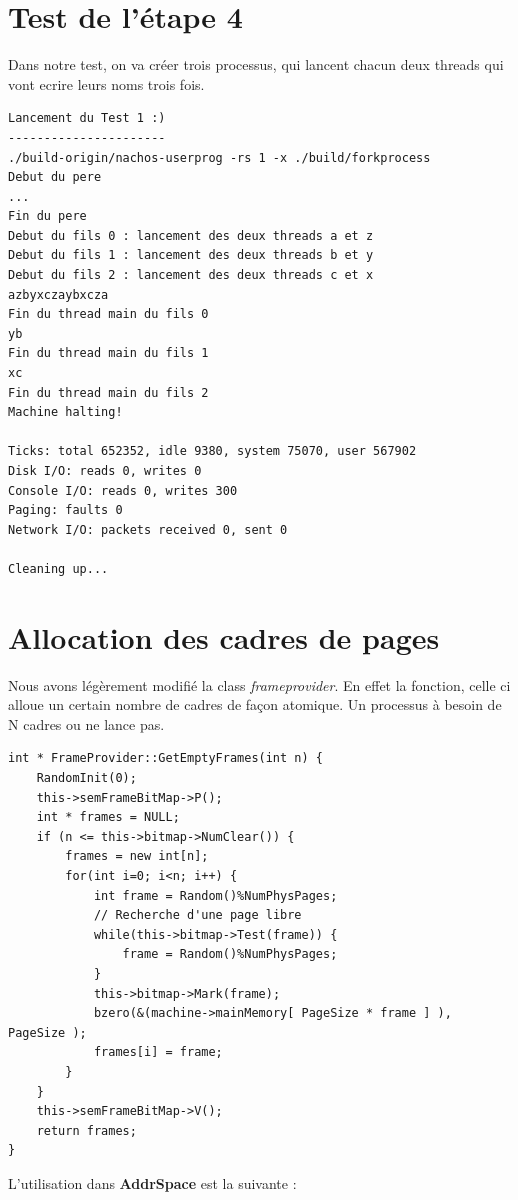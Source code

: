 \documentclass[a4paper,10pt]{article}
\begin{document}
\section{Test de l'étape 4}

Dans notre test, on va créer trois processus, qui lancent chacun deux threads
qui vont ecrire leurs noms trois fois.

\begin{lstlisting}
Lancement du Test 1 :)
----------------------
./build-origin/nachos-userprog -rs 1 -x ./build/forkprocess
Debut du pere
...
Fin du pere
Debut du fils 0 : lancement des deux threads a et z
Debut du fils 1 : lancement des deux threads b et y
Debut du fils 2 : lancement des deux threads c et x
azbyxczaybxcza
Fin du thread main du fils 0
yb
Fin du thread main du fils 1
xc
Fin du thread main du fils 2
Machine halting!

Ticks: total 652352, idle 9380, system 75070, user 567902
Disk I/O: reads 0, writes 0
Console I/O: reads 0, writes 300
Paging: faults 0
Network I/O: packets received 0, sent 0

Cleaning up...
\end{lstlisting}

\section{Allocation des cadres de pages}

Nous avons légèrement modifié la class \textit{frameprovider}. En effet
la fonction, celle ci alloue un certain nombre de cadres de façon atomique. Un
processus à besoin de N cadres ou ne lance pas.

\begin{lstlisting}
int * FrameProvider::GetEmptyFrames(int n) {
    RandomInit(0);
    this->semFrameBitMap->P();
    int * frames = NULL;
    if (n <= this->bitmap->NumClear()) {
        frames = new int[n];
        for(int i=0; i<n; i++) {
            int frame = Random()%NumPhysPages;
            // Recherche d'une page libre
            while(this->bitmap->Test(frame)) {
                frame = Random()%NumPhysPages;
            }
            this->bitmap->Mark(frame);
            bzero(&(machine->mainMemory[ PageSize * frame ] ), PageSize );
            frames[i] = frame;
        }
    }
    this->semFrameBitMap->V();
    return frames;
}
\end{lstlisting}


L'utilisation dans \textbf{AddrSpace} est la suivante :
\end{document}
